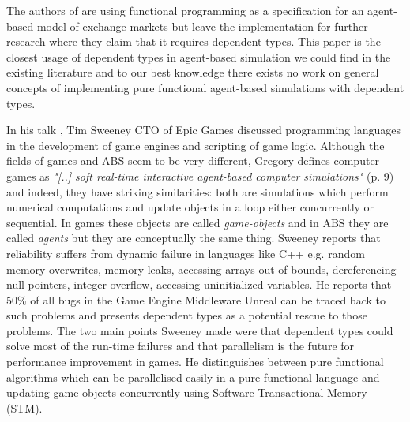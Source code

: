 The authors of \cite{botta_functional_2011} are using functional programming as a specification for an agent-based model of exchange markets but leave the implementation for further research where they claim that it requires dependent types. This paper is the closest usage of dependent types in agent-based simulation we could find in the existing literature and to our best knowledge there exists no work on general concepts of implementing pure functional agent-based simulations with dependent types. %

In his talk \cite{sweeney_next_2006}, Tim Sweeney CTO of Epic Games discussed programming languages in the development of game engines and scripting of game logic. Although the fields of games and ABS seem to be very different, Gregory \cite{gregory_game_2018} defines computer-games as \textit{"[..] soft real-time interactive agent-based computer simulations"} (p. 9) and indeed, they have striking similarities: both are simulations which perform numerical computations and update objects in a loop either concurrently or sequential. In games these objects are called \textit{game-objects} and in ABS they are called \textit{agents} but they are conceptually the same thing.  Sweeney reports that reliability suffers from dynamic failure in languages like C++ e.g. random memory overwrites, memory leaks, accessing arrays out-of-bounds, dereferencing null pointers, integer overflow, accessing uninitialized variables. He reports that 50\% of all bugs in the Game Engine Middleware Unreal can be traced back to such problems and presents dependent types as a potential rescue to those problems. The two main points Sweeney made were that dependent types could solve most of the run-time failures and that parallelism is the future for performance improvement in games. He distinguishes between pure functional algorithms which can be parallelised easily in a pure functional language and updating game-objects concurrently using Software Transactional Memory (STM).